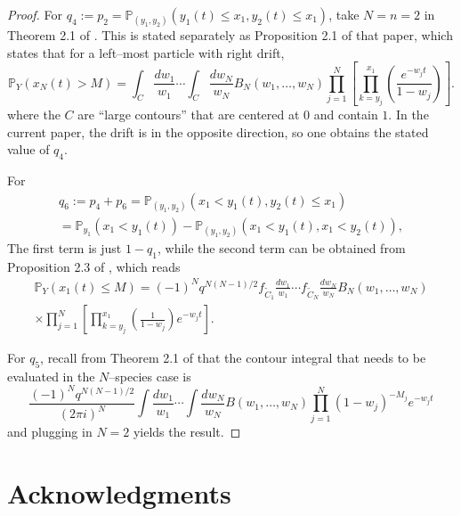 \documentclass{ximera}
\begin{document}
\begin{proof}
For $q_4:=p_2 = \mathbb{P}_{(y_1,y_2)}\left( y_1(t) \leq x_1,y_2(t)\le x_1 \right)$, take $N=n=2$ in Theorem 2.1 of \cite{Lee-Wang-2017}. This is stated separately as Proposition 2.1 of that paper, which states that for a left--most particle with right drift, 
$$\mathbb{P}_{Y}\left(x_{N}(t)>M\right)=\int_{C} \frac{d w_{1}}{w_{1}} \cdots \int_{C} \frac{d w_{N}}{w_{N}} B_{N}\left(w_{1}, \ldots, w_{N}\right) \prod_{j=1}^{N}\left[\prod_{k=y_{j}}^{x_1}\left(\frac{e^{-w_{j} t}}{1-w_{j}}\right) \right].$$
where the $C$ are ``large contours'' that are centered at $0$ and contain $1$. In the current paper, the drift is in the opposite direction, so one obtains the stated value of $q_4$.
 
For
\begin{multline*}
  q_6:=p_4+p_6 = \mathbb{P}_{(y_1,y_2)}(x_1<y_1(t), y_2(t) \leq x_1) \\
= \mathbb{P}_{y_1}(x_1<y_1(t)) - \mathbb{P}_{(y_1,y_2)}(x_1<y_1(t), x_1 < y_2(t) ),  
\end{multline*}
The first term is just $1-q_1$, while the second term can be obtained from Proposition 2.3 of \cite{Lee-Wang-2017}, which reads 
\begin{multline*}
  \mathbb{P}_{Y}\left(x_{1}(t) \leq M\right)=(-1)^{N} q^{N(N-1) / 2} f_{\tilde{C}_{1}} \frac{d w_{1}}{w_{1}} \cdots f_{\tilde{C}_{N}} \frac{d w_{N}}{w_{N}} B_{N}\left(w_{1}, \ldots, w_{N}\right)  \\ \times\prod_{j=1}^{N}\left[\prod_{k=y_{j}}^{x_1}\left(\frac{1}{1-w_{j}}\right) e^{-w_{j} t}\right].  
\end{multline*}




For $q_5$, recall from  Theorem 2.1 of  \cite{Kua21} that the contour integral that needs to be evaluated in the $N$--species case is
$$
\frac{(-1)^N q^{N(N-1)/2}}{(2\pi i)^N}\int \frac{dw_1}{w_1} \cdots \int \frac{dw_N}{w_N} B(w_1,\ldots,w_N) \prod_{j=1}^N (1-w_j)^{-{M}_j} e^{-w_jt  }   
$$
and plugging in $N=2$ yields the result. 



\end{proof}















\section*{Acknowledgments}
\end{document}
